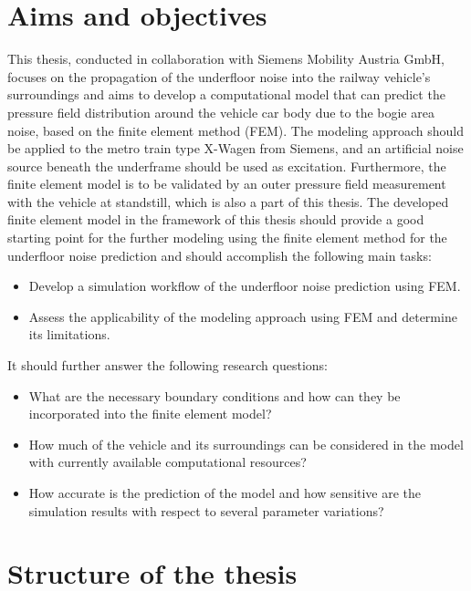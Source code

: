 \section{Aims and objectives}

This thesis, conducted in collaboration with Siemens Mobility Austria GmbH, focuses on the propagation of the underfloor noise into the railway vehicle's surroundings and aims to develop a computational model that can predict the pressure field distribution around the vehicle car body due to the bogie area noise, based on the finite element method (FEM).
The modeling approach should be applied to the metro train type X-Wagen from Siemens, and an artificial noise source beneath the underframe should be used as excitation.
Furthermore, the finite element model is to be validated by an outer pressure field measurement with the vehicle at standstill, which is also a part of this thesis.
The developed finite element model in the framework of this thesis should provide a good starting point for the further modeling using the finite element method for the underfloor noise prediction and should accomplish the following main tasks:
\begin{itemize}
	\item Develop a simulation workflow of the underfloor noise prediction using FEM.
	\item Assess the applicability of the modeling approach using FEM and determine its limitations.
\end{itemize}
It should further answer the following research questions:
\begin{itemize}
    \item What are the necessary boundary conditions and how can they be incorporated into the finite element model?
	\item How much of the vehicle and its surroundings can be considered in the model with currently available computational resources?
	\item How accurate is the prediction of the model and how sensitive are the simulation results with respect to several parameter variations?
\end{itemize}

\section{Structure of the thesis}

